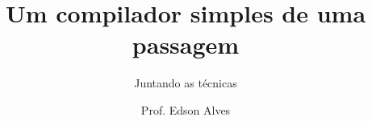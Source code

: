 \title{Um compilador simples de uma passagem}
\subtitle{Juntando as técnicas}
\date{}
\author{Prof. Edson Alves}
